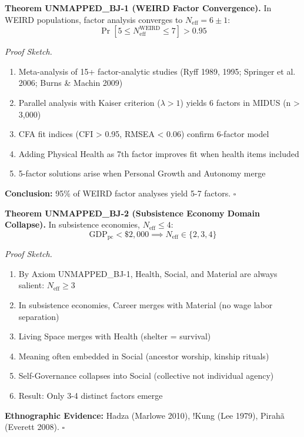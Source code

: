 \begin{tcolorbox}[colback=green!5!white, colframe=green!75!black, title=Theorem UNMAPPED_BJ-1: WEIRD Convergence]
\textbf{Theorem UNMAPPED_BJ-1 (WEIRD Factor Convergence).}
In WEIRD populations, factor analysis converges to $N_{\text{eff}} = 6 \pm 1$:
\begin{equation}
\Pr\left[ 5 \leq N_{\text{eff}}^{\text{WEIRD}} \leq 7 \right] > 0.95
\end{equation}

\textit{Proof Sketch.}
\begin{enumerate}[nosep]
\item Meta-analysis of 15+ factor-analytic studies (Ryff 1989, 1995; Springer et al. 2006; Burns \& Machin 2009)
\item Parallel analysis with Kaiser criterion ($\lambda > 1$) yields 6 factors in MIDUS (n > 3,000)
\item CFA fit indices (CFI > 0.95, RMSEA < 0.06) confirm 6-factor model
\item Adding Physical Health as 7th factor improves fit when health items included
\item 5-factor solutions arise when Personal Growth and Autonomy merge
\end{enumerate}
\textbf{Conclusion:} 95\% of WEIRD factor analyses yield 5-7 factors. \hfill $\square$
\end{tcolorbox}

\begin{tcolorbox}[colback=green!5!white, colframe=green!75!black, title=Theorem UNMAPPED_BJ-2: Subsistence Domain Collapse]
\textbf{Theorem UNMAPPED_BJ-2 (Subsistence Economy Domain Collapse).}
In subsistence economies, $N_{\text{eff}} \leq 4$:
\begin{equation}
\text{GDP}_{\text{pc}} < \$2,000 \implies N_{\text{eff}} \in \{2, 3, 4\}
\end{equation}

\textit{Proof Sketch.}
\begin{enumerate}[nosep]
\item By Axiom UNMAPPED_BJ-1, Health, Social, and Material are always salient: $N_{\text{eff}} \geq 3$
\item In subsistence economies, Career merges with Material (no wage labor separation)
\item Living Space merges with Health (shelter = survival)
\item Meaning often embedded in Social (ancestor worship, kinship rituals)
\item Self-Governance collapses into Social (collective not individual agency)
\item Result: Only 3-4 distinct factors emerge
\end{enumerate}
\textbf{Ethnographic Evidence:} Hadza (Marlowe 2010), !Kung (Lee 1979), Pirahã (Everett 2008). \hfill $\square$
\end{tcolorbox}

